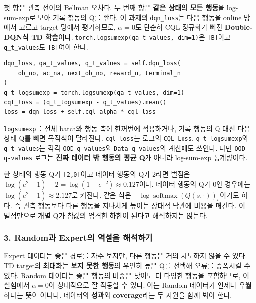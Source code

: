 \documentclass[11pt,a4paper]{article}
\begin{document}
첫 항은 관측 전이의 Bellman 오차다. 두 번째 항은 \textbf{같은 상태의 모든 행동}을 log-sum-exp로 모아 기록 행동의 Q를 뺀다. 이 과제의 \texttt{dqn\_\allowbreak{}loss}는 다음 행동을 online 망에서 고르고 target 망에서 평가하므로, $\alpha=0$도 단순히 CQL 정규화가 빠진 \textbf{Double-DQN식 TD 학습}이다. \texttt{torch.\allowbreak{}logsumexp(qa\_\allowbreak{}t\_\allowbreak{}values,\allowbreak{} dim=1)}은 \texttt{[B]}이고 \texttt{q\_\allowbreak{}t\_\allowbreak{}values}도 \texttt{[B]}여야 한다.\par

\begin{verbatim}
dqn_loss, qa_t_values, q_t_values = self.dqn_loss(
    ob_no, ac_na, next_ob_no, reward_n, terminal_n
)
q_t_logsumexp = torch.logsumexp(qa_t_values, dim=1)
cql_loss = (q_t_logsumexp - q_t_values).mean()
loss = dqn_loss + self.cql_alpha * cql_loss
\end{verbatim}

\texttt{logsumexp}를 전체 batch와 행동 축에 한꺼번에 적용하거나, 기록 행동의 Q 대신 다음 상태 Q를 빼면 목적식이 달라진다. \texttt{cql\_\allowbreak{}loss}는 로그의 \texttt{CQL Loss}, \texttt{q\_\allowbreak{}t\_\allowbreak{}logsumexp}와 \texttt{q\_\allowbreak{}t\_\allowbreak{}values}는 각각 \texttt{OOD q-values}와 \texttt{Data q-values}의 계산에도 쓰인다. 다만 \texttt{OOD q-values} 로그는 \textbf{진짜 데이터 밖 행동의 평균 Q}가 아니라 log-sum-exp 통계량이다.\par

한 상태의 행동 Q가 \texttt{[2,\allowbreak{}0]}이고 데이터 행동의 Q가 2라면 벌점은 $\log(e^2+1)-2=\log(1+e^{-2})\approx0.127$이다. 데이터 행동의 Q가 0인 경우에는 $\log(e^2+1)\approx2.127$로 커진다. 같은 식은 $-\log\operatorname{softmax}(Q(s,\cdot))_a$이기도 하다. 즉 관측 행동보다 다른 행동을 지나치게 높이는 상대적 낙관에 비용을 매긴다. 이 벌점만으로 개별 Q가 참값의 엄격한 하한이 된다고 해석하지는 않는다.\par

\subsubsection{3. Random과 Expert의 역설을 해석하기}

Expert 데이터는 좋은 경로를 자주 보지만, 다른 행동은 거의 시도하지 않을 수 있다. TD target의 최대화는 \textbf{보지 못한 행동}의 우연히 높은 Q를 선택해 오류를 증폭시킬 수 있다. Random 데이터는 좋은 행동의 비중은 낮아도 더 다양한 행동을 포함하므로, 이 실험에서 $\alpha=0$이 상대적으로 잘 작동할 수 있다. 이는 Random 데이터가 언제나 우월하다는 뜻이 아니다. 데이터의 \textbf{성과}와 \textbf{coverage}라는 두 자원을 함께 봐야 한다.\par
\end{document}
